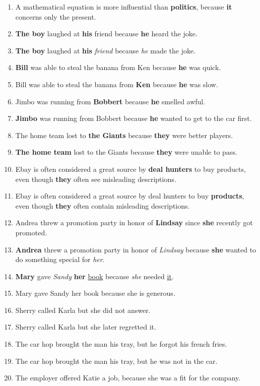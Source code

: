 \documentclass{article}
\begin{document}
\begin{enumerate}
	\item A mathematical equation is more influential than {\bf politics}, because {\bf it} concerns only the present.
	\item {\bf The boy} laughed at {\bf his} friend because {\bf he} heard the joke.
	\item {\bf The boy} laughed at {\bf his} {\it friend} because {\it he} made the joke.
	\item {\bf Bill} was able to steal the banana from Ken because {\bf he} was quick.
	\item Bill was able to steal the banana from {\bf Ken} because {\bf he} was slow.
	\item Jimbo was running from {\bf Bobbert} because {\bf he} smelled awful.
	\item {\bf Jimbo} was running from Bobbert because {\bf he} wanted to get to the car first.
	\item The home team lost to {\bf the Giants} because {\bf they} were better players.
	\item {\bf The home team} lost to the Giants because {\bf they} were unable to pass.
	\item Ebay is often considered a great source by {\bf deal hunters} to buy products, even though {\bf they} often see misleading descriptions.
	\item Ebay is often considered a great source by deal hunters to buy {\bf products}, even though {\bf they} often contain misleading descriptions.
	\item Andrea threw a promotion party in honor of {\bf Lindsay} since {\bf she} recently got promoted.
	\item {\bf Andrea} threw a promotion party in honor of {\it Lindsay} because {\bf she} wanted to do something special for {\it her}.
	\item {\bf Mary}  gave {\it Sandy} {\bf her} \underline{book} because {\it she} needed \underline{it}.
	\item Mary gave Sandy her book because she is generous.
	\item Sherry called Karla but she did not answer.
	\item Sherry called Karla but she later regretted it.
	\item The car hop brought the man his tray, but he forgot his french fries.
	\item The car hop brought the man his tray, but he was not in the car.
	\item The employer offered Katie a job, because she was a fit for the company.

\end{enumerate}
\end{document}
